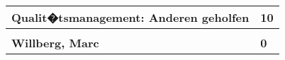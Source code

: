 \documentclass[a4paper,11pt]{scrartcl}
\begin{document}
\begin{longtable}{| p{13.8cm} | C{2.4cm} |}
  Qualit�tsmanagement: Anderen geholfen
	&
  10
	\\
	\hline


	&

	\\
	\hline
	\hline


	\textbf{Willberg, Marc} & \textbf{0}\\ %
	\hline

	\hline

\end{longtable}
\end{document}
